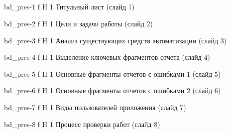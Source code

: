 \begin{appendices}
	\chapter{}
	{bd_pres-1} %
	{f} %
	{H} %
	{1\textwidth} %
	{Титульный лист (слайд 1)} %
	
	{bd_pres-2} %
	{f} %
	{H} %
	{1\textwidth} %
	{Цели и задачи работы (слайд 2)} %
	
	{bd_pres-3} %
	{f} %
	{H} %
	{1\textwidth} %
	{Анализ существующих средств автоматизации (слайд 3)} %
	
	{bd_pres-4} %
	{f} %
	{H} %
	{1\textwidth} %
	{Выделение ключевых фрагментов отчета (слайд 4)} %
	
	{bd_pres-5} %
	{f} %
	{H} %
	{1\textwidth} %
	{Основные фрагменты отчетов с ошибками 1 (слайд 5)} %
	
	{bd_pres-6} %
	{f} %
	{H} %
	{1\textwidth} %
	{Основные фрагменты отчетов с ошибками 2 (слайд 6)} %
	
	{bd_pres-7} %
	{f} %
	{H} %
	{1\textwidth} %
	{Виды пользователей приложения (слайд 7)} %
	
	{bd_pres-8} %
	{f} %
	{H} %
	{1\textwidth} %
	{Процесс проверки работ (слайд 8)} %
	

\end{appendices}
